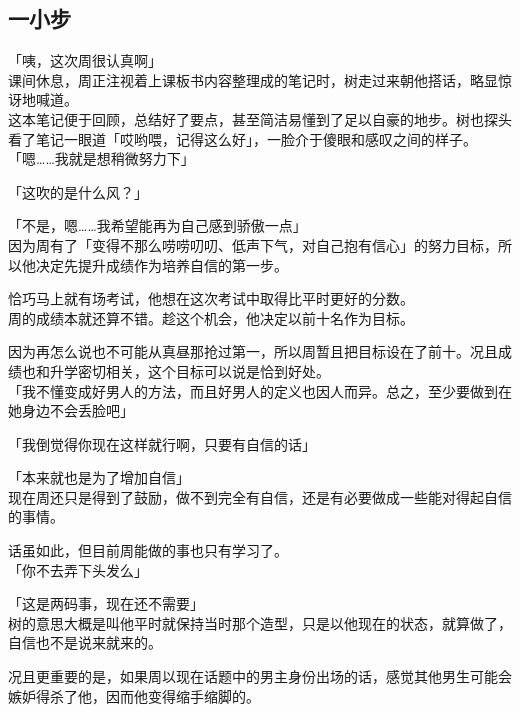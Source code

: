\subsection{一小步}

「咦，这次周很认真啊」\\

课间休息，周正注视着上课板书内容整理成的笔记时，树走过来朝他搭话，略显惊讶地喊道。\\

这本笔记便于回顾，总结好了要点，甚至简洁易懂到了足以自豪的地步。树也探头看了笔记一眼道「哎哟喂，记得这么好」，一脸介于傻眼和感叹之间的样子。\\

「嗯……我就是想稍微努力下」

「这吹的是什么风？」

「不是，嗯……我希望能再为自己感到骄傲一点」\\

因为周有了「变得不那么唠唠叨叨、低声下气，对自己抱有信心」的努力目标，所以他决定先提升成绩作为培养自信的第一步。

恰巧马上就有场考试，他想在这次考试中取得比平时更好的分数。\\

周的成绩本就还算不错。趁这个机会，他决定以前十名作为目标。

因为再怎么说也不可能从真昼那抢过第一，所以周暂且把目标设在了前十。况且成绩也和升学密切相关，这个目标可以说是恰到好处。\\

「我不懂变成好男人的方法，而且好男人的定义也因人而异。总之，至少要做到在她身边不会丢脸吧」

「我倒觉得你现在这样就行啊，只要有自信的话」

「本来就也是为了增加自信」\\

现在周还只是得到了鼓励，做不到完全有自信，还是有必要做成一些能对得起自信的事情。

话虽如此，但目前周能做的事也只有学习了。\\

「你不去弄下头发么」

「这是两码事，现在还不需要」\\

树的意思大概是叫他平时就保持当时那个造型，只是以他现在的状态，就算做了，自信也不是说来就来的。

况且更重要的是，如果周以现在话题中的男主身份出场的话，感觉其他男生可能会嫉妒得杀了他，因而他变得缩手缩脚的。\\

